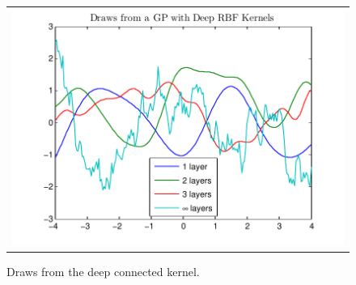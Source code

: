 \documentclass[twoside]{article}
\makeatletter
\newlength{\nonHumbleHeight}
\def\@humbleformat#1{{\settoheight{\nonHumbleHeight}{#1}\resizebox{!}{0.94\nonHumbleHeight}{#1}}}%
\def\humble#1{\@humbleformat{#1}}%
\newcommand{\gp}{{\humble GP}}
\makeatother
\begin{document}
\begin{figure}[h]
\centering
\begin{tabular}{c}
\hspace{-0.5cm}\includegraphics[width=\columnwidth, clip, trim = 0cm 0cm 1cm 0.61cm]{figures/deep_kernel_connected_draws} \\
\end{tabular}
\caption{Draws from the deep connected kernel.}
\label{fig:deep_kernel_connected_draws}
\end{figure}
\end{document}
